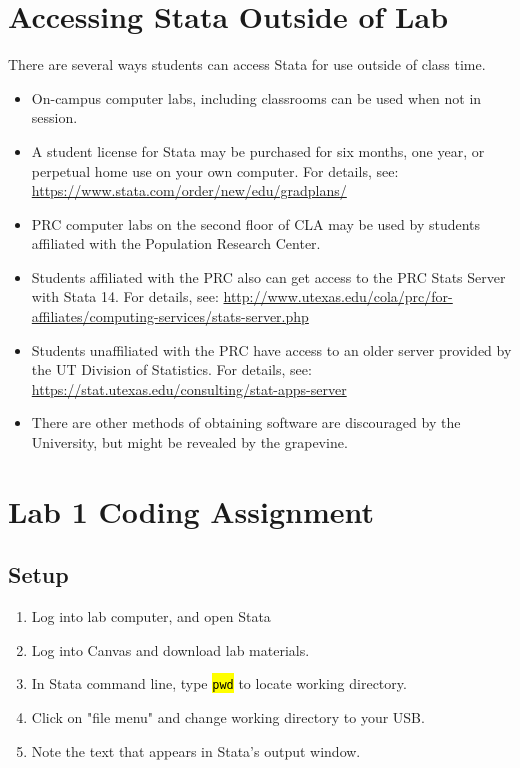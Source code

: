 \documentclass{tufte-handout}
\begin{document}
\section{Accessing Stata Outside of Lab}
There are several ways students can access Stata for use outside of class time.
\begin{itemize}
	\item On-campus computer labs, including classrooms can be used when not in session.
	\item A student license for Stata may be purchased for six months, one year, or perpetual home use on your own computer. For details, see: \url{https://www.stata.com/order/new/edu/gradplans/}
	\item PRC computer labs on the second floor of CLA may be used by students affiliated with the Population Research Center.
	\item Students affiliated with the PRC also can get access to the PRC Stats Server with Stata 14. For details, see: \url{http://www.utexas.edu/cola/prc/for-affiliates/computing-services/stats-server.php}
	\item Students unaffiliated with the PRC have access to an older server provided by the UT Division of Statistics. For details, see: \url{https://stat.utexas.edu/consulting/stat-apps-server} 
	\item There are other methods of obtaining software are discouraged by the University, but might be revealed by the grapevine.
\end{itemize}

\newpage
\section{Lab 1 Coding Assignment}
\subsection{Setup \protect{}}
\begin{enumerate}[leftmargin=.5in]
	\item Log into lab computer, and open Stata
	\item Log into Canvas and download lab materials.
	\item In Stata command line, type {\tt \hl{pwd}} to locate working directory.
	\item Click on "file menu" and change working directory to your USB.
	\item Note the text that appears in Stata's output window.
\end{enumerate}
\end{document}
